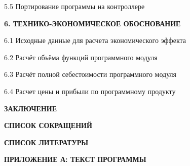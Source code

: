 {    \par 5.5 Портирование программы на контроллере 
    \par {\bfseries 6. ТЕХНИКО-ЭКОНОМИЧЕСКОЕ ОБОСНОВАНИЕ }
    \par 6.1 Исходные данные для расчета экономического эффекта 
    \par 6.2 Расчёт объёма функций программного модуля 
    \par 6.3 Расчёт полной себестоимости программного модуля 
    \par 6.4 Расчет цены и прибыли по программному продукту 
    \par {\bfseries ЗАКЛЮЧЕНИЕ } 
    \par {\bfseries СПИСОК СОКРАЩЕНИЙ } 
    \par {\bfseries СПИСОК ЛИТЕРАТУРЫ } 
    \par {\bfseries ПРИЛОЖЕНИЕ А: ТЕКСТ ПРОГРАММЫ} 
    \par 
}